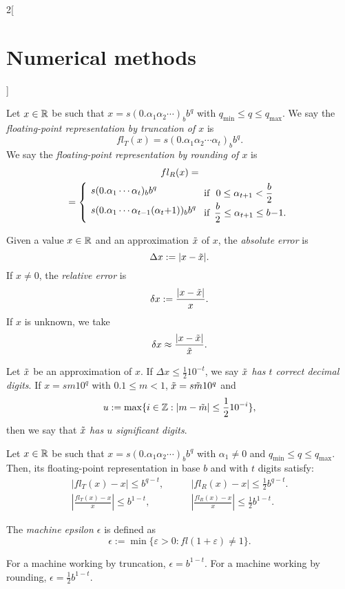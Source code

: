 \documentclass[../../../main.tex]{subfiles}
\begin{document}
\begin{multicols}{2}[\section{Numerical methods}]
\begin{table}[ht]
\end{table}
\begin{definition}
    Let $x\in\mathbb{R}$ be such that $x=s(0.\alpha_1\alpha_2\cdots)_bb^q$ with $q_\text{min}\leq q\leq q_\text{max}$. We say the \textit{floating-point representation by truncation of $x$} is $$fl_T(x)=s(0.\alpha_1\alpha_2\cdots\alpha_t)_bb^q.$$ We say the \textit{floating-point representation by rounding of $x$} is
    \begin{multline*}
        fl_R(x)=\\=\left\{\text{\setlength{\tabcolsep}{4pt}\begin{tabular}{m{3.85cm}m{3cm}}
            $s(0.\alpha_1\cdots\alpha_t)_bb^q$ & if $\ 0\leq\alpha_{t+1}<\frac{b}{2}$\\
            $s(0.\alpha_1\cdots\alpha_{t-1}(\alpha_t+1))_bb^q$ & if $\ \frac{b}{2}\leq\alpha_{t+1}\leq b-1.$
        \end{tabular}}\right.
    \end{multline*}
\end{definition}
\begin{definition}
    Given a value $x\in\mathbb{R}$ and an approximation $\Tilde{x}$ of $x$, the \textit{absolute error} is $$\Delta x:=|x-\Tilde{x}|.$$ If $x\ne 0$, the \textit{relative error} is $$\delta x:=\frac{|x-\Tilde{x}|}{x}.$$ If $x$ is unknown, we take $$\delta x\approx\frac{|x-\Tilde{x}|}{\Tilde{x}}.$$
\end{definition}
\begin{definition}
    Let $\Tilde{x}$ be an approximation of $x$. If $\Delta x\leq\frac{1}{2}10^{-t}$, we say \textit{$\Tilde{x}$ has $t$ correct decimal digits}. If $x=sm10^q$ with $0.1\leq m<1$, $\Tilde{x}=s\Tilde{m}10^q$ and $$u:=\max\{i\in\mathbb{Z}:|m-\Tilde{m}|\leq\frac{1}{2}10^{-i}\},$$ then we say that $\Tilde{x}$ \textit{has $u$ significant digits}.
\end{definition}
\begin{prop}
    Let $x\in\mathbb{R}$ be such that $x=s(0.\alpha_1\alpha_2\cdots)_bb^q$ with $\alpha_1\ne0$ and $q_\text{min}\leq q\leq q_\text{max}$. Then, its floating-point representation in base $b$ and with $t$ digits satisfy:
    \begin{align*}
        \left|fl_T(x)-x\right|\leq b^{q-t},\quad&\quad \left|fl_R(x)-x\right|\leq\frac{1}{2}b^{q-t}.\\
        \left|\frac{fl_T(x)-x}{x}\right|\leq b^{1-t},\quad&\quad \left|\frac{fl_R(x)-x}{x}\right|\leq\frac{1}{2}b^{1-t}.
    \end{align*}
\end{prop}
\begin{definition}
    The \textit{machine epsilon $\epsilon$} is defined as $$\epsilon:=\min\{\varepsilon>0:fl(1+\varepsilon)\ne 1\}.$$
\end{definition}
\begin{prop}
    For a machine working by truncation, $\epsilon=b^{1-t}$. For a machine working by rounding, $\epsilon=\frac{1}{2}b^{1-t}$.
\end{prop}

\end{multicols}
\end{document}
